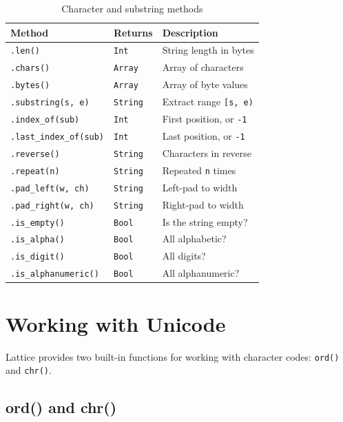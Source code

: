 \begin{table}[ht]
\centering
\begin{tabular}{lll}
\toprule
\textbf{Method} & \textbf{Returns} & \textbf{Description} \\
\midrule
\lstinline|.len()| & \lstinline|Int| & String length in bytes \\
\lstinline|.chars()| & \lstinline|Array| & Array of characters \\
\lstinline|.bytes()| & \lstinline|Array| & Array of byte values \\
\lstinline|.substring(s, e)| & \lstinline|String| & Extract range \lstinline|[s, e)| \\
\lstinline|.index_of(sub)| & \lstinline|Int| & First position, or \lstinline|-1| \\
\lstinline|.last_index_of(sub)| & \lstinline|Int| & Last position, or \lstinline|-1| \\
\lstinline|.reverse()| & \lstinline|String| & Characters in reverse \\
\lstinline|.repeat(n)| & \lstinline|String| & Repeated \lstinline|n| times \\
\lstinline|.pad_left(w, ch)| & \lstinline|String| & Left-pad to width \\
\lstinline|.pad_right(w, ch)| & \lstinline|String| & Right-pad to width \\
\lstinline|.is_empty()| & \lstinline|Bool| & Is the string empty? \\
\lstinline|.is_alpha()| & \lstinline|Bool| & All alphabetic? \\
\lstinline|.is_digit()| & \lstinline|Bool| & All digits? \\
\lstinline|.is_alphanumeric()| & \lstinline|Bool| & All alphanumeric? \\
\bottomrule
\end{tabular}
\caption{Character and substring methods}\label{tab:char-methods}
\end{table}

\section{Working with Unicode}\label{sec:unicode}

Lattice provides two built-in functions for working with character codes: \lstinline|ord()| and \lstinline|chr()|.

\subsection{ord() and chr()}\label{sec:ord-chr}

